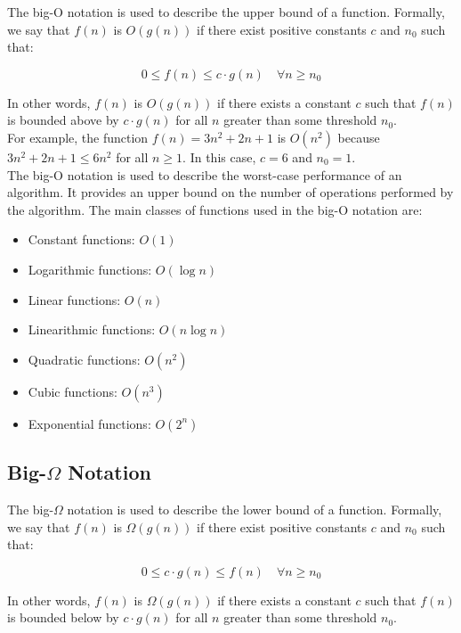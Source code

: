 The big-O notation is used to describe the upper bound of a function. Formally,
we say that $f(n)$ is $O(g(n))$ if there exist positive constants $c$ and $n_0$
such that:

\begin{equation}
    0 \leq f(n) \leq c \cdot g(n) \quad \forall n \geq n_0
\end{equation}

In other words, $f(n)$ is $O(g(n))$ if there exists a constant $c$ such that
$f(n)$ is bounded above by $c \cdot g(n)$ for all $n$ greater than some
threshold $n_0$.\\

For example, the function $f(n) = 3n^2 + 2n + 1$ is $O(n^2)$ because $3n^2 + 2n
+ 1 \leq 6n^2$ for all $n \geq 1$. In this case, $c = 6$ and $n_0 = 1$.\\

The big-O notation is used to describe the worst-case performance of an
algorithm. It provides an upper bound on the number of operations performed by
the algorithm. The main classes of functions used in the big-O notation are:

\begin{itemize}
    \item Constant functions: $O(1)$
    \item Logarithmic functions: $O(\log n)$
    \item Linear functions: $O(n)$
    \item Linearithmic functions: $O(n \log n)$
    \item Quadratic functions: $O(n^2)$
    \item Cubic functions: $O(n^3)$
    \item Exponential functions: $O(2^n)$
\end{itemize}

\subsection{Big-$\Omega$ Notation}

The big-$\Omega$ notation is used to describe the lower bound of a function.
Formally, we say that $f(n)$ is $\Omega(g(n))$ if there exist positive constants
$c$ and $n_0$ such that:

\begin{equation}
    0 \leq c \cdot g(n) \leq f(n) \quad \forall n \geq n_0
\end{equation}

In other words, $f(n)$ is $\Omega(g(n))$ if there exists a constant $c$ such
that $f(n)$ is bounded below by $c \cdot g(n)$ for all $n$ greater than some
threshold $n_0$.\\

